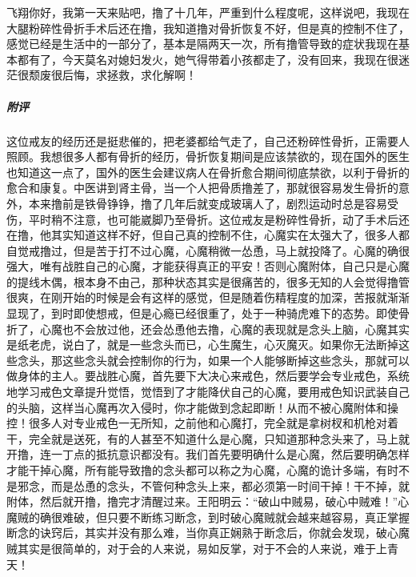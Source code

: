 \begin{case}
    飞翔你好，我第一天来贴吧，撸了十几年，严重到什么程度呢，这样说吧，我现在大腿粉碎性骨折手术后还在撸，我知道撸对骨折恢复不好，但是真的控制不住了，感觉已经是生活中的一部分了，基本是隔两天一次，所有撸管导致的症状我现在基本都有了，今天莫名对媳妇发火，她气得带着小孩都走了，没有回来，我现在很迷茫很颓废很后悔，求拯救，求化解啊！
    \subparagraph{附评} 这位戒友的经历还是挺悲催的，把老婆都给气走了，自己还粉碎性骨折，正需要人照顾。我想很多人都有骨折的经历，骨折恢复期间是应该禁欲的，现在国外的医生也知道这一点了，国外的医生会建议病人在骨折愈合期间彻底禁欲，以利于骨折的愈合和康复。中医讲到肾主骨，当一个人把骨质撸差了，那就很容易发生骨折的意外，本来撸前是铁骨铮铮，撸了几年后就变成玻璃人了，剧烈运动时总是容易受伤，平时稍不注意，也可能崴脚乃至骨折。这位戒友是粉碎性骨折，动了手术后还在撸，他其实知道这样不好，但自己真的控制不住，心魔实在太强大了，很多人都自觉戒撸过，但是苦于打不过心魔，心魔稍微一怂恿，马上就投降了。心魔的确很强大，唯有战胜自己的心魔，才能获得真正的平安！否则心魔附体，自己只是心魔的提线木偶，根本身不由己，那种状态其实是很痛苦的，很多无知的人会觉得撸管很爽，在刚开始的时候是会有这样的感觉，但是随着伤精程度的加深，苦报就渐渐显现了，到时即使想戒，但是心瘾已经很重了，处于一种骑虎难下的态势。即使骨折了，心魔也不会放过他，还会怂恿他去撸，心魔的表现就是念头上脑，心魔其实是纸老虎，说白了，就是一些念头而已，心生魔生，心灭魔灭。如果你无法断掉这些念头，那这些念头就会控制你的行为，如果一个人能够断掉这些念头，那就可以做身体的主人。要战胜心魔，首先要下大决心来戒色，然后要学会专业戒色，系统地学习戒色文章提升觉悟，觉悟到了才能降伏自己的心魔，要用戒色知识武装自己的头脑，这样当心魔再次入侵时，你才能做到念起即断！从而不被心魔附体和操控！很多人对专业戒色一无所知，之前他和心魔打，完全就是拿树杈和机枪对着干，完全就是送死，有的人甚至不知道什么是心魔，只知道那种念头来了，马上就开撸，连一丁点的抵抗意识都没有。我们首先要明确什么是心魔，然后要明确怎样才能干掉心魔，所有能导致撸的念头都可以称之为心魔，心魔的诡计多端，有时不是邪念，而是怂恿的念头，不管何种念头上来，都必须第一时间干掉！干不掉，就附体，然后就开撸，撸完才清醒过来。王阳明云：“破山中贼易，破心中贼难！”心魔贼的确很难破，但只要不断练习断念，到时破心魔贼就会越来越容易，真正掌握断念的诀窍后，其实并没有那么难，当你真正娴熟于断念后，你就会发现，破心魔贼其实是很简单的，对于会的人来说，易如反掌，对于不会的人来说，难于上青天！
\end{case}

